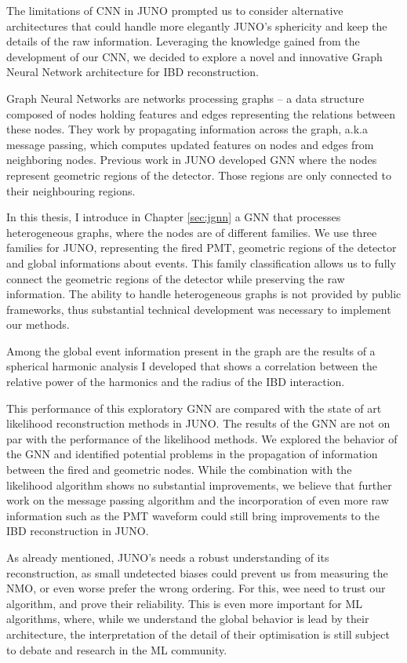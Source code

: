 \documentclass[../main.tex]{subfiles}
\begin{document}
The limitations of CNN in JUNO prompted us to consider alternative architectures that could handle more elegantly JUNO's sphericity and keep the details of the raw information. Leveraging the knowledge gained from the development of our CNN, we decided to explore a novel and innovative Graph Neural Network architecture for IBD reconstruction.

Graph Neural Networks are networks processing graphs -- a data structure composed of nodes holding features and edges representing the relations between these nodes. They work by propagating information across the graph, a.k.a message passing,
which computes updated features on nodes and edges from neighboring nodes. Previous work in JUNO developed GNN where the nodes represent geometric regions of the detector. Those regions are only connected to their neighbouring regions.

In this thesis, I introduce in Chapter \ref{sec:jgnn} a GNN that processes heterogeneous graphs, where the nodes are of different families. We use three families for JUNO, representing the fired PMT, geometric regions of the detector and global informations about events.
This family classification allows us to fully connect the geometric regions of the detector while preserving the raw information. The ability to handle heterogeneous graphs is not provided by public frameworks, thus substantial technical development was necessary to implement our methods.

Among the global event information present in the graph are the results of a spherical harmonic analysis I developed that shows a correlation between the relative power of the harmonics and the radius of the IBD interaction.

This performance of this exploratory GNN are compared with the state of art likelihood reconstruction methods in JUNO. The results of the GNN are not on par with the performance of the likelihood methods. We explored the behavior of the GNN and identified potential problems in the propagation of information between the fired and geometric nodes. While the combination with the likelihood algorithm shows no substantial improvements, we believe that further work on the message passing algorithm and the incorporation of even more raw information such as the PMT waveform could still bring improvements to the IBD reconstruction in JUNO.

\hfill

As already mentioned, JUNO's needs a robust understanding of its reconstruction, as small undetected biases could prevent us from measuring the NMO, or even worse prefer the wrong ordering. For this, wee need to trust our algorithm, and prove their reliability. This is even more important for ML algorithms, where, while we understand the global behavior is lead by their architecture, the interpretation of the detail of their optimisation is still subject to debate and research in the ML community.
\end{document}
